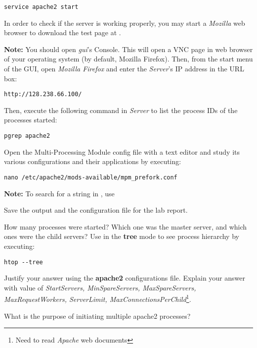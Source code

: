 \documentclass{../UTNetLab}
\begin{document}
\begin{lstlisting}
service apache2 start
\end{lstlisting}

In order to check if the server is working properly, you may start a \textit{Mozilla} web browser to download the test page at .

\textbf{Note: } You should open \textit{gui}'s Console. This will open a VNC page in web browser of your operating system (by default, Mozilla Firefox). Then, from the start menu of the GUI, open \textit{Mozilla Firefox} and enter the \textit{Server}'s IP address in the URL box:

\begin{lstlisting}
http://128.238.66.100/
\end{lstlisting}

Then, execute the following command in \textit{Server} to list the process IDs of the  processes started:

\begin{lstlisting}
pgrep apache2
\end{lstlisting}

Open the Multi-Processing Module config file with a text editor and study its various configurations and their applications by executing:

\begin{lstlisting}
nano /etc/apache2/mods-available/mpm_prefork.conf
\end{lstlisting}

\textbf{Note: } To search for a string in , use 

Save the output and the configuration file for the lab report.

\begin{report}
    \item How many  processes were started?
    Which one was the master server, and which ones were the child servers?
    Use  in the \textbf{tree} mode to see process hierarchy by executing:
    
\begin{lstlisting}
htop --tree
\end{lstlisting}

    Justify your answer using the \textbf{apache2} configurations file.
    Explain your answer with value of \textit{StartServers, MinSpareServers, MaxSpareServers, MaxRequestWorkers, ServerLimit, MaxConnectionsPerChild}\footnote{Need to read \textit{Apache} web documents}.

    \item What is the purpose of initiating multiple apache2 processes?
\end{report}
\end{document}
